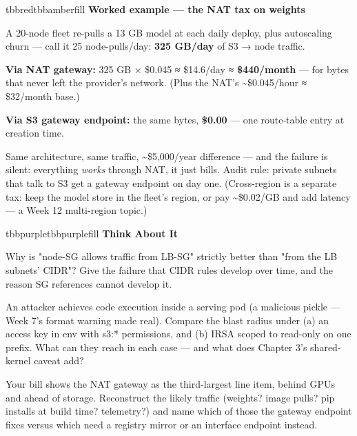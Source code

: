 \begin{calloutbox}{tbbred}{tbbamberfill}
{\normalsize\bfseries\color{tbbamberdark}Worked example — the NAT tax on weights}\par\vspace{3pt}
A 20-node fleet re-pulls a 13 GB model at each daily deploy, plus autoscaling churn — call it 25 node-pulls/day: \textbf{325 GB/day} of S3 → node traffic.

\begin{tbbitemize}
  \item \textbf{Via NAT gateway:} 325 GB × \$0.045 ≈ \$14.6/day ≈ \textbf{\$440/month} — for bytes that never left the provider's network. (Plus the NAT's \textasciitilde{}\$0.045/hour ≈ \$32/month base.)
  \item \textbf{Via S3 gateway endpoint:} the same bytes, \textbf{\$0.00} — one route-table entry at creation time.
\end{tbbitemize}

Same architecture, same traffic, \textasciitilde{}\$5,000/year difference — and the failure is silent: everything \textit{works} through NAT, it just bills. Audit rule: private subnets that talk to S3 get a gateway endpoint on day one. (Cross-region is a separate tax: keep the model store in the fleet's region, or pay \textasciitilde{}\$0.02/GB and add latency — a Week 12 multi-region topic.)
\end{calloutbox}

\vspace{3.0pt}

\begin{calloutbox}{tbbpurple}{tbbpurplefill}
{\normalsize\bfseries\color{tbbpurple}Think About It}\par\vspace{3pt}
\begin{tbbitemize}
  \item Why is "node-SG allows traffic from LB-SG" strictly better than "from the LB subnets' CIDR"? Give the failure that CIDR rules develop over time, and the reason SG references cannot develop it.
  \item An attacker achieves code execution inside a serving pod (a malicious pickle — Week 7's format warning made real). Compare the blast radius under (a) an access key in env with s3:* permissions, and (b) IRSA scoped to read-only on one prefix. What can they reach in each case — and what does Chapter 3's shared-kernel caveat add?
  \item Your bill shows the NAT gateway as the third-largest line item, behind GPUs and ahead of storage. Reconstruct the likely traffic (weights? image pulls? pip installs at build time? telemetry?) and name which of those the gateway endpoint fixes versus which need a registry mirror or an interface endpoint instead.
\end{tbbitemize}
\end{calloutbox}

